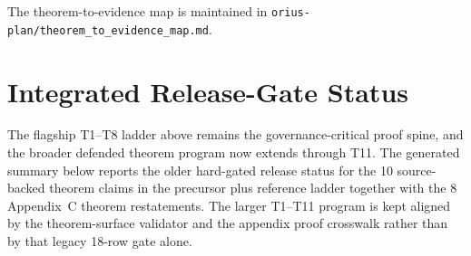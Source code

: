 The theorem-to-evidence map is maintained in \texttt{orius-plan/theorem\_to\_evidence\_map.md}.

\section{Integrated Release-Gate Status}

The flagship T1--T8 ladder above remains the governance-critical proof spine,
and the broader defended theorem program now extends through T11.  The
generated summary below reports the older hard-gated release status for the 10
source-backed theorem claims in the precursor plus reference ladder together
with the 8 Appendix~C theorem restatements.  The larger T1--T11 program is
kept aligned by the theorem-surface validator and the appendix proof crosswalk
rather than by that legacy 18-row gate alone.


\endgroup

